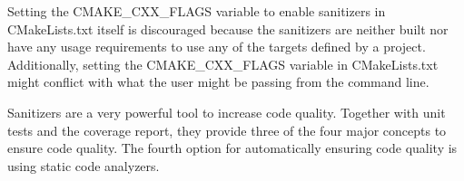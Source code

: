 \begin{tcolorbox}[colback=webgreen!5!white,colframe=webgreen!75!black,title=Note]
Setting the CMAKE\_CXX\_FLAGS variable to enable sanitizers in CMakeLists.txt itself is discouraged because the sanitizers are neither built nor have any usage requirements to use any of the targets defined by a project. Additionally, setting the CMAKE\_CXX\_FLAGS variable in CMakeLists.txt might conflict with what the user might be passing from the command line.
\end{tcolorbox}

Sanitizers are a very powerful tool to increase code quality. Together with unit tests and the coverage report, they provide three of the four major concepts to ensure code quality. The fourth option for automatically ensuring code quality is using static code analyzers.

































